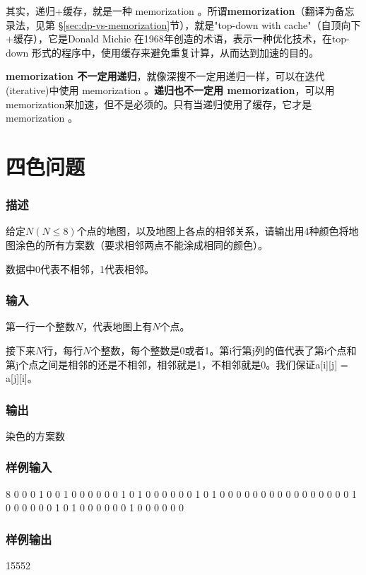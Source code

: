 其实，递归+缓存，就是一种 memorization 。所谓\textbf{memorization}（翻译为备忘录法，见第 \S \ref{sec:dp-vs-memorization}节），就是"top-down with cache"（自顶向下+缓存），它是Donald Michie 在1968年创造的术语，表示一种优化技术，在top-down 形式的程序中，使用缓存来避免重复计算，从而达到加速的目的。

\textbf{memorization 不一定用递归}，就像深搜不一定用递归一样，可以在迭代(iterative)中使用 memorization 。\textbf{递归也不一定用 memorization}，可以用memorization来加速，但不是必须的。只有当递归使用了缓存，它才是 memorization 。


\section{四色问题} %

\subsubsection{描述}
给定$N(N \leq 8)$个点的地图，以及地图上各点的相邻关系，请输出用4种颜色将地图涂色的所有方案数（要求相邻两点不能涂成相同的颜色）。

数据中0代表不相邻，1代表相邻。

\subsubsection{输入}
第一行一个整数$N$，代表地图上有$N$个点。

接下来$N$行，每行$N$个整数，每个整数是0或者1。第i行第j列的值代表了第i个点和第j个点之间是相邻的还是不相邻，相邻就是1，不相邻就是0。我们保证a[i][j] = a[j][i]。

\subsubsection{输出}
染色的方案数

\subsubsection{样例输入}
\begin{Code}
8
0 0 0 1 0 0 1 0 
0 0 0 0 0 1 0 1 
0 0 0 0 0 0 1 0 
1 0 0 0 0 0 0 0 
0 0 0 0 0 0 0 0 
0 1 0 0 0 0 0 0 
1 0 1 0 0 0 0 0 
0 1 0 0 0 0 0 0
\end{Code}

\subsubsection{样例输出}
\begin{Code}
15552
\end{Code}

